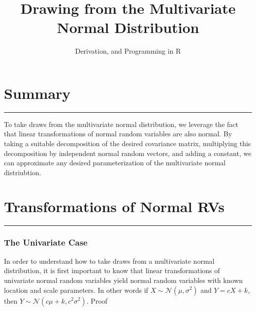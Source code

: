 \documentclass[
]{article}
\title{Drawing from the Multivariate Normal Distribution}
\subtitle{Derivation, and Programming in R}
\author{}
\date{\vspace{-2.5em}}
\begin{document}
\maketitle

{
\setcounter{tocdepth}{2}
\tableofcontents
}
\hfill\break

\newcommand{\L}{\mathcal{L}}
\newcommand{\bm}[1]{\boldsymbol{#1}}
\newcommand{\argmax}[1]{\mathop{\arg \max}_#1}
\newcommand{\pder}[1]{\dfrac{\partial}{\partial #1}}
\newcommand{\pdertwo}[2]{\dfrac{\partial #1}{\partial #2}}
\newcommand{\d}{\mathrm{d}}
\newcommand{\sumin}{\sum_{i=1}^n}
\newcommand\numberthis{\addtocounter{equation}{1}\tag{\theequation}}
\newcommand{\E}{\mathbb{E}}
\newcommand{\var}{\mathrm{Var}}
\newcommand{\mrm}{\mathrm}
\newcommand{\R}{\mathbb{R}}
\newcommand{\Cov}{\mathrm{Cov}}

\hypertarget{summary}{%
\section{Summary}\label{summary}}

\begin{center}\rule{0.5\linewidth}{0.5pt}\end{center}

To take draws from the multivariate normal distribution, we leverage the
fact that linear transformations of normal random variables are also
normal. By taking a suitable decomposition of the desired covariance
matrix, multiplying this decomposition by independent normal random
vectors, and adding a constant, we can approximate any desired
parameterization of the multivariate normal distriubtion.

\hfill\break

\hypertarget{transformations-of-normal-rvs}{%
\section{Transformations of Normal
RVs}\label{transformations-of-normal-rvs}}

\begin{center}\rule{0.5\linewidth}{0.5pt}\end{center}

\hypertarget{the-univariate-case}{%
\subsubsection{The Univariate Case}\label{the-univariate-case}}

In order to understand how to take draws from a multivariate normal
distribution, it is first important to know that linear transformations
of univariate normal random variables yield normal random variables with
known location and scale parameters. In other words if
\(X \sim \mathcal{N}(\mu, \sigma^2)\) and \(Y = cX + k\), then
\(Y \sim \mathcal{N}(c\mu + k, c^2\sigma^2)\). Proof
\end{document}
